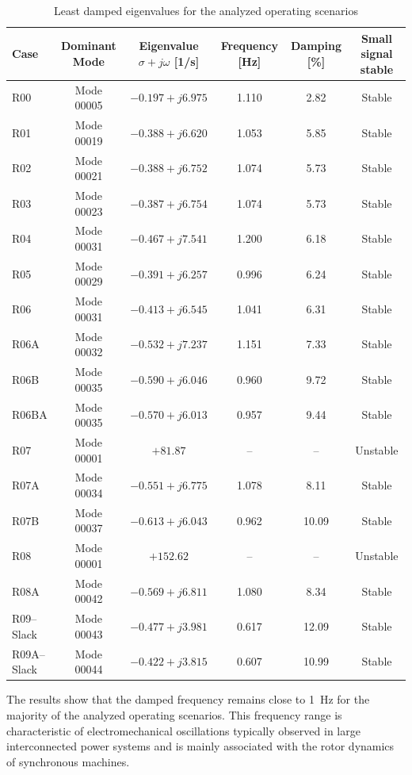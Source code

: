 \begin{table}[htbp]
\centering
\caption{Least damped eigenvalues for the analyzed operating scenarios}
\label{tab:least_damped_modes}
\begin{tabular}{lccccc}
\toprule
Case & Dominant Mode & Eigenvalue $\sigma + j\omega$ [1/s] & Frequency [Hz] & Damping [\%] & Small signal stable \\
\midrule
R00 & Mode 00005 & $-0.197 + j6.975$ & 1.110 & 2.82 & Stable \\
R01 & Mode 00019 & $-0.388 + j6.620$ & 1.053 & 5.85 & Stable \\
R02 & Mode 00021 & $-0.388 + j6.752$ & 1.074 & 5.73 & Stable \\
R03 & Mode 00023 & $-0.387 + j6.754$ & 1.074 & 5.73 & Stable \\
R04 & Mode 00031 & $-0.467 + j7.541$ & 1.200 & 6.18 & Stable \\
R05 & Mode 00029 & $-0.391 + j6.257$ & 0.996 & 6.24 & Stable \\
R06 & Mode 00031 & $-0.413 + j6.545$ & 1.041 & 6.31 & Stable \\
R06A & Mode 00032 & $-0.532 + j7.237$ & 1.151 & 7.33 & Stable \\
R06B & Mode 00035 & $-0.590 + j6.046$ & 0.960 & 9.72 & Stable \\
R06BA & Mode 00035 & $-0.570 + j6.013$ & 0.957 & 9.44 & Stable \\
R07 & Mode 00001 & $+81.87$ & -- & -- & Unstable \\
R07A & Mode 00034 & $-0.551 + j6.775$ & 1.078 & 8.11 & Stable \\
R07B & Mode 00037 & $-0.613 + j6.043$ & 0.962 & 10.09 & Stable \\
R08 & Mode 00001 & $+152.62$ & -- & -- & Unstable \\
R08A & Mode 00042 & $-0.569 + j6.811$ & 1.080 & 8.34 & Stable \\
R09--Slack & Mode 00043 & $-0.477 + j3.981$ & 0.617 & 12.09 & Stable \\
R09A--Slack & Mode 00044 & $-0.422 + j3.815$ & 0.607 & 10.99 & Stable \\
\bottomrule
\end{tabular}
\end{table}

The results show that the damped frequency remains close to 1~Hz for the majority of the analyzed operating scenarios. This frequency range is characteristic of electromechanical oscillations typically observed in large interconnected power systems and is mainly associated with the rotor dynamics of synchronous machines.

